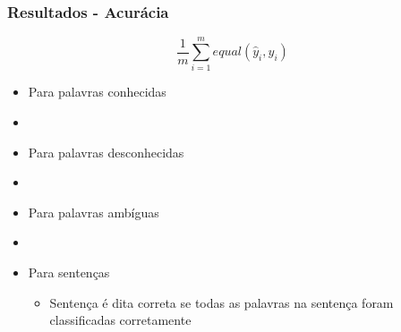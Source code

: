 \documentclass[10pt]{beamer}
\begin{document}
\begin{frame}[fragile]
  \frametitle{Resultados - Acurácia}

    \begin{equation} \nonumber
      \frac{1}{m} \sum\limits_{i=1}^{m} equal(\hat{y}_i, y_i) 
    \end{equation}

    \begin{itemize}

      \item Para palavras conhecidas

      \item[\ ] \

      \item Para palavras desconhecidas

      \item[\ ] \

      \item Para palavras ambíguas

      \item[\ ] \

      \item Para sentenças

      \begin{itemize}
        \item[-] Sentença é dita correta se todas as palavras na sentença foram classificadas corretamente
      \end{itemize}

    \end{itemize}


\end{frame}
\end{document}
